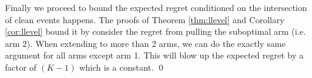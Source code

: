 Finally we proceed to bound the expected regret conditioned on the intersection of clean events happens. The proofs of Theorem \ref{thm:llevel} and Corollary \ref{cor:llevel} bound it by consider the regret from pulling the suboptimal arm (i.e. arm 2). When extending to more than 2 arms, we can do the exactly same argument for all arms except arm 1. This will blow up the expected regret by a factor of $(K-1)$ which is a constant.
\qed

 
